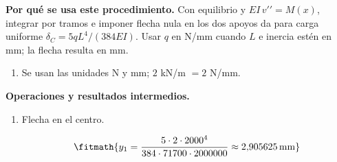 \noindent\textbf{Por qué se usa este procedimiento.} Con equilibrio y $EI\,v\prime\prime=M(x)$, integrar por tramos e imponer flecha nula en los dos apoyos da para carga uniforme $\delta_C=5qL^4/(384EI)$. Usar $q$ en N/mm cuando $L$ e inercia estén en mm; la flecha resulta en mm.

\begin{enumerate}

\item Se usan las unidades N y mm; $2$ kN/m $= 2$ N/mm.

\end{enumerate}

\noindent\textbf{Operaciones y resultados intermedios.}

\begin{enumerate}

\item Flecha en el centro.

\[\fitmath{y_{1}=\frac{5\cdot 2\cdot {2000}^{4}}{384\cdot 71700\cdot 2000000}\approx 2{,}905625\,\mathrm{mm}}\]

\end{enumerate}
